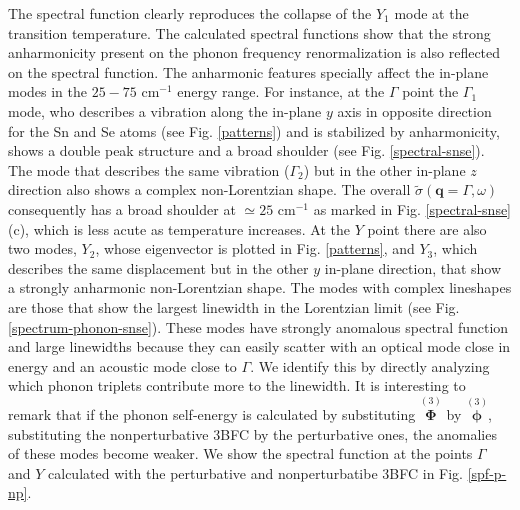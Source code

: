 The spectral function clearly reproduces the collapse of the $Y_{1}$ mode at the transition temperature. The calculated spectral functions show that the strong anharmonicity present on the phonon frequency renormalization is also 
reflected on the spectral function. The anharmonic features specially affect the in-plane modes in the $25-75$ cm$^{-1}$ energy range. For instance, at the $\Gamma$ point the $\Gamma_{1}$ mode, who describes a vibration along 
the in-plane $y$ axis in opposite direction for the Sn and Se atoms (see Fig. \ref{patterns}) and is stabilized by anharmonicity, shows a double peak structure and a broad shoulder (see Fig. \ref{spectral-snse}). The mode that 
describes the same vibration ($\Gamma_{2}$) but in the other in-plane $z$ direction also shows a complex non-Lorentzian shape. The overall $\tilde{\sigma}(\boldsymbol{q}=\Gamma,\omega)$ consequently has a broad shoulder 
at $\simeq25$ cm$^{-1}$ as marked in Fig. \ref{spectral-snse} (c), which is less acute as temperature increases. At the $Y$ point there are also two modes, $Y_{2}$, whose eigenvector is plotted in Fig. \ref{patterns}, and 
$Y_{3}$, which describes the same displacement but in the other $y$ in-plane direction, that show a strongly anharmonic non-Lorentzian shape. The modes with complex lineshapes are those that show the largest linewidth in the 
Lorentzian limit (see Fig. \ref{spectrum-phonon-snse}). These modes have strongly anomalous spectral function and large linewidths because they can easily scatter with an optical mode close in energy and an acoustic mode 
close to $\Gamma$. We identify this by directly analyzing which phonon triplets contribute more to the linewidth. It is interesting to remark that if the phonon self-energy is calculated by substituting 
$\overset{(3)}{\boldsymbol{\Phi}}$ by $\overset{(3)}{\boldsymbol{\phi}}$, substituting the nonperturbative 3BFC by the perturbative ones, the anomalies of these modes become weaker. We show the spectral function at the points $\Gamma$ 
and $Y$ calculated with the perturbative and nonperturbatibe 3BFC in Fig. \ref{spf-p-np}.
